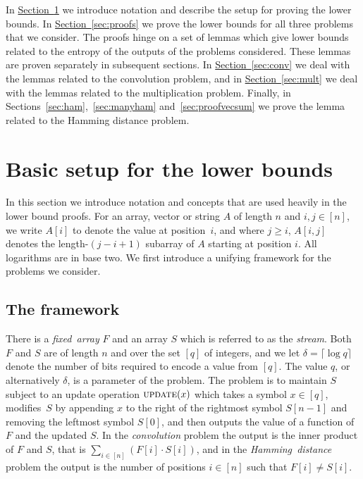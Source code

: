 \documentclass[11pt]{article}
\numberwithin{equation}{section}
\theoremstyle{definition}
\theoremstyle{plain}
\newcommand{\expref}[2]{\hyperref[#2]{#1~\ref{#2}}}
\renewcommand{\S}{{\ensuremath{S}}} %
\newcommand{\arrive}{\ensuremath{\textsc{update}}}
\begin{document}
In \expref{Section}{sec:preliminaries} we introduce notation and describe the setup for proving the lower bounds.
In \expref{Section}{sec:proofs} we prove the lower bounds for all three problems that we consider. The proofs hinge on a set of lemmas which give lower bounds related to the entropy of the outputs of the problems considered. These lemmas are proven separately in subsequent sections.
In \expref{Section}{sec:conv} we deal with the lemmas related to the convolution problem, and
in \expref{Section}{sec:mult} we deal with the lemmas related to the multiplication problem.
Finally, in Sections~\ref{sec:ham},~\ref{sec:manyham} and~\ref{sec:proofvecsum} we prove the lemma related to the Hamming distance problem.




\section{Basic setup for the lower bounds}\label{sec:preliminaries}

In this section we introduce notation and concepts that are used heavily
in the lower bound proofs.
%
For an array, vector or string $A$ of length $n$ and $i,j\in[n]$, we write $A[i]$
to denote the value at position~$i$, and where $j\geq i$, $A[i,j]$
denotes the %
length-$(j-i+1)$    %
subarray of $A$ starting at position
$i$. All logarithms are in base two.
We first introduce a unifying framework for the problems we consider.
%


\subsection{The framework}
There is a \emph{fixed~array}
$F$ and an array $S$ which is referred
to as the \emph{stream}.
Both $F$ and $S$ are of length $n$ and over the set $[q]$ of integers,
%
and we let $\delta=\lceil \log q \rceil$ denote the number of bits required to encode a value from $[q]$.
The value $q$, or alternatively $\delta$, is a parameter of the problem.
%
%
The problem is to maintain $S$ subject to an update operation $\arrive(x)$ which takes a symbol $x\in [q]$, modifies~$S$ by appending $x$ to the right of the rightmost symbol $\S[n-1]$ and removing the leftmost symbol $S[0]$, and then outputs the value of a function of $F$ and the updated $S$.
In the \emph{convolution} problem the output is the inner product of $F$ and $S$, that is $\sum_{i\in[n]}(F[i]\cdot S[i])$, and in
the \emph{Hamming~distance} problem the output is the number of positions $i\in[n]$ such that $F[i]\neq S[i]$.
\end{document}
